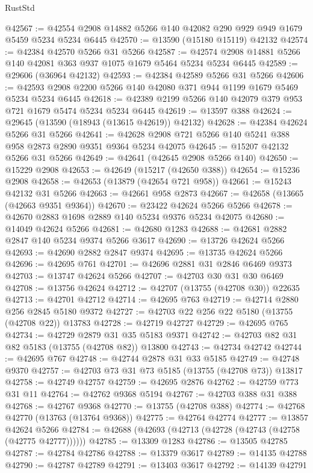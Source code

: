 \begin{lexlean}{RustStd}
\begin{coremodule}
@42567 := @42554 @2908 @14882 @5266 @140 @42082 @290 @929 @949 @1679 @5459 @5234 @5234 @6445
@42570 := @13590 (@15180 @15119) @42132
@42574 := @42384 @42570 @5266 @31 @5266
@42587 := @42574 @2908 @14881 @5266 @140 @42081 @363 @937 @1075 @1679 @5464 @5234 @5234 @6445
@42589 := @29606 (@36964 @42132)
@42593 := @42384 @42589 @5266 @31 @5266
@42606 := @42593 @2908 @2200 @5266 @140 @42080 @371 @944 @1199 @1679 @5469 @5234 @5234 @6445
@42618 := @42389 @2199 @5266 @140 @42079 @379 @953 @721 @1679 @5474 @5234 @5234 @6445
@42619 := @13597 @388
@42624 := @29645 (@13590 (@18943 (@13615 @42619)) @42132)
@42628 := @42384 @42624 @5266 @31 @5266
@42641 := @42628 @2908 @721 @5266 @140 @5241 @388 @958 @2873 @2890 @9351 @9364 @5234 @42075
@42645 := @15207 @42132 @5266 @31 @5266
@42649 := @42641 (@42645 @2908 @5266 @140)
@42650 := @15229 @2908
@42653 := @42649 (@15217 (@42650 @388))
@42654 := @15236 @2908
@42658 := @42653 (@13879 (@42654 @721 @958))
@42661 := @15243 @42132 @31 @5266
@42663 := @42661 @958 @2873
@42667 := @42658 (@13665 (@42663 @9351 @9364))
@42670 := @23422 @42624 @5266 @5266
@42678 := @42670 @2883 @1698 @2889 @140 @5234 @9376 @5234 @42075
@42680 := @14049 @42624 @5266
@42681 := @42680 @1283
@42688 := @42681 @2882 @2847 @140 @5234 @9374 @5266 @3617
@42690 := @13726 @42624 @5266
@42693 := @42690 @2882 @2847 @9374
@42695 := @13735 @42624 @5266
@42696 := @42695 @761
@42701 := @42696 @2881 @31 @2846 @6469 @9373
@42703 := @13747 @42624 @5266
@42707 := @42703 @30 @31 @30 @6469
@42708 := @13756 @42624
@42712 := @42707 (@13755 (@42708 @30)) @22635
@42713 := @42701 @42712
@42714 := @42695 @763
@42719 := @42714 @2880 @256 @2845 @5180 @9372
@42727 := @42703 @22 @256 @22 @5180 (@13755 (@42708 @22)) @13783
@42728 := @42719 @42727
@42729 := @42695 @765
@42734 := @42729 @2879 @31 @35 @5183 @9371
@42742 := @42703 @82 @31 @82 @5183 (@13755 (@42708 @82)) @13800
@42743 := @42734 @42742
@42744 := @42695 @767
@42748 := @42744 @2878 @31 @33 @5185
@42749 := @42748 @9370
@42757 := @42703 @73 @31 @73 @5185 (@13755 (@42708 @73)) @13817
@42758 := @42749 @42757
@42759 := @42695 @2876
@42762 := @42759 @773 @31 @11
@42764 := @42762 @9368 @5194
@42767 := @42703 @388 @31 @388
@42768 := @42767 @9368
@42770 := @13755 (@42708 @388)
@42774 := @42768 @42770 (@13763 (@13764 @9368))
@42775 := @42764 @42774
@42777 := @13857 @42624 @5266
@42784 := @42688 (@42693 (@42713 (@42728 (@42743 (@42758 (@42775 @42777))))))
@42785 := @13309 @1283
@42786 := @13505 @42785
@42787 := @42784 @42786
@42788 := @13379 @3617
@42789 := @14135 @42788
@42790 := @42787 @42789
@42791 := @13403 @3617
@42792 := @14139 @42791

\end{coremodule}
\end{lexlean}
